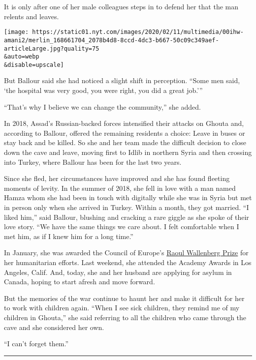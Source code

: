 It is only after one of her male colleagues steps in to defend her that
the man relents and leaves.

\texttt{[image: https://static01.nyt.com/images/2020/02/11/multimedia/00ihw-amani2/merlin\_168661704\_2078b4d8-8ccd-4dc3-b667-50c09c349aef-articleLarge.jpg?quality=75\\\&auto=webp\\\&disable=upscale]}

But Ballour said she had noticed a slight shift in perception. ``Some
men said, `the hospital was very good, you were right, you did a great
job.'''

``That's why I believe we can change the community,'' she added.

In 2018, Assad's Russian-backed forces intensified their attacks on
Ghouta and, according to Ballour, offered the remaining residents a
choice: Leave in buses or stay back and be killed. So she and her team
made the difficult decision to close down the cave and leave, moving
first to Idlib in northern Syria and then crossing into Turkey, where
Ballour has been for the last two years.

Since she fled, her circumstances have improved and she has found
fleeting moments of levity. In the summer of 2018, she fell in love with
a man named Hamza whom she had been in touch with digitally while she
was in Syria but met in person only when she arrived in Turkey. Within a
month, they got married. ``I liked him,'' said Ballour, blushing and
cracking a rare giggle as she spoke of their love story. ``We have the
same things we care about. I felt comfortable when I met him, as if I
knew him for a long time.''

In January, she was awarded the Council of Europe's
\href{https://www.coe.int/en/web/human-rights-rule-of-law/-/dr-amani-ballour-a-paediatrician-from-syria-has-been-awarded-the-council-of-europe-s-raoul-wallenberg-prize}{Raoul
Wallenberg Prize} for her humanitarian efforts. Last weekend, she
attended the Academy Awards in Los Angeles, Calif. And, today, she and
her husband are applying for asylum in Canada, hoping to start afresh
and move forward.

But the memories of the war continue to haunt her and make it difficult
for her to work with children again. ``When I see sick children, they
remind me of my children in Ghouta,'' she said referring to all the
children who came through the cave and she considered her own.

``I can't forget them.''

\begin{center}\rule{0.5\linewidth}{\linethickness}\end{center}

